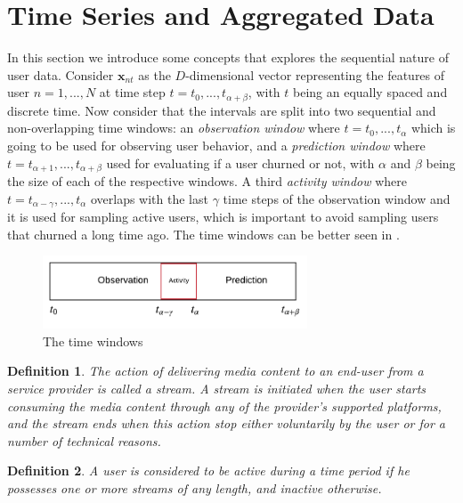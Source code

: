 \documentclass{kththesis}
\newtheorem{definition}{Definition}
\begin{document}
\section{Time Series and Aggregated Data}
\label{sec:timewindows}

In this section we introduce some concepts that explores the sequential nature of user data. Consider $\mathbf{x}_{nt}$ as the $D$-dimensional vector representing the features of user $n=1,...,N$ at time step $t = t_0,...,t_{\alpha+\beta}$, with $t$ being an equally spaced and discrete time. Now consider that the intervals are split into two sequential and non-overlapping time windows: an \emph{observation window} where $t = t_0,...,t_\alpha$ which is going to be used for observing user behavior, and a \emph{prediction window} where $t = t_{\alpha+1},...,t_{\alpha+\beta}$ used for evaluating if a user churned or not, with $\alpha$ and $\beta$ being the size of each of the respective windows. A third \emph{activity window} where $t=t_{\alpha-\gamma},...,t_\alpha$ overlaps with the last $\gamma$ time steps of the observation window and it is used for sampling active users, which is important to avoid sampling users that churned a long time ago. The time windows can be better seen in .

\begin{figure}[h]
    \centering
    \includegraphics[width=0.7\textwidth,keepaspectratio]{figures/timewindows.pdf}
    \caption{The time windows}
    \label{fig:timewindows}
\end{figure}

\begin{definition}
The action of delivering media content to an end-user from a service provider is called a \emph{stream}. A stream is initiated when the user starts consuming the media content through any of the provider's supported platforms, and the stream ends when this action stop either voluntarily by the user or for a number of technical reasons.
\end{definition}

\begin{definition}
A user is considered to be \emph{active} during a time period if he possesses one or more streams of any length, and \emph{inactive} otherwise.
\end{definition}
\end{document}
